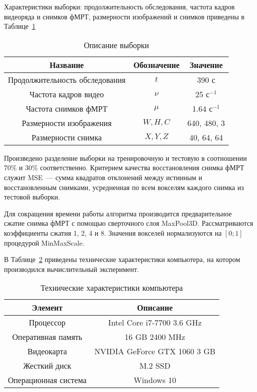 \documentclass[a4paper, 12pt]{extarticle}
\begin{document}
Характеристики выборки: продолжительность обследования,
частота кадров видеоряда и снимков фМРТ, размерности изображений
и снимков приведены в Таблице~\ref{table:sample}

\begin{table}[h!]
	\centering
	\caption{Описание выборки}
	\begin{tabular}{|c|c|c|}
		\hline
		Название                       & Обозначение & Значение             \\
		\hline \hline
		Продолжительность обследования & $t$         & 390 с                \\ \hline
		Частота кадров видео           & $\nu$       & 25 $\text{с}^{-1}$   \\ \hline
		Частота снимков фМРТ           & $\mu$       & 1.64 $\text{с}^{-1}$ \\ \hline
		Размерности изображения        & $W, H, C$   & 640, 480, 3          \\ \hline
		Размерности снимка             & $X, Y, Z$   & 40, 64, 64           \\ \hline
	\end{tabular}
	\label{table:sample}
\end{table}

Произведено разделение выборки на тренировочную и тестовую в соотношении 70\% и 30\% соответственно.
Критерием качества восстановления снимка фМРТ служит MSE~--- сумма квадратов отклонений
между истинным и восстановленным снимками, усредненная по всем вокселям каждого снимка
из тестовой выборки.

Для сокращения времени работы алгоритма производится предварительное сжатие снимка фМРТ
с помощью сверточного слоя MaxPool3D. Рассматриваются коэффициенты сжатия 1, 2, 4 и 8.
Значения вокселей нормализуются на $[0; 1]$ процедурой MinMaxScale.

В Таблице~\ref{table:pc} приведены технические характеристики компьютера, на котором
производился вычислительный эксперимент.

\begin{table}[h!]
	\centering
	\caption{Технические характеристики компьютера}
	\begin{tabular}{|c|c|}
		\hline
		Элемент & Описание \\
		\hline \hline
		Процессор & Intel Core i7-7700 3.6 GHz \\ \hline
		Оперативная память & 16 GB 2400 MHz \\ \hline
		Видеокарта & NVIDIA GeForce GTX 1060 3 GB \\ \hline
		Жесткий диск & M.2 SSD \\ \hline
		Операционная система & Windows 10 \\ \hline
	\end{tabular}
	\label{table:pc}
\end{table}
\end{document}
